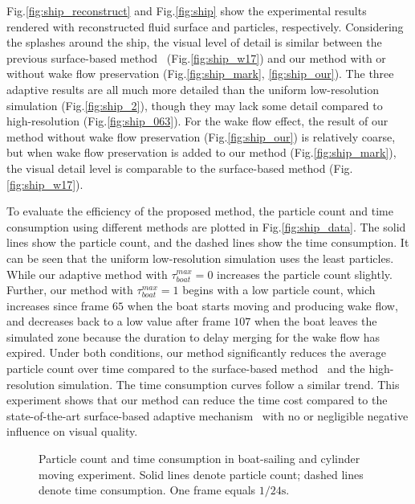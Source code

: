 \documentclass[VANCOUVER,STIX1COL]{WileyNJD-v2}
\begin{document}
Fig.\ref{fig:ship_reconstruct} and Fig.\ref{fig:ship} show the experimental results rendered with reconstructed fluid surface and particles, respectively. Considering the splashes around the ship, the visual level of detail is similar between the previous surface-based method~\cite{Winchenbach17} (Fig.\ref{fig:ship_w17}) and our method with or without wake flow preservation (Fig.\ref{fig:ship_mark}, \ref{fig:ship_our}). The three adaptive results are all much more detailed than the uniform low-resolution simulation (Fig.\ref{fig:ship_2}), though they may lack some detail compared to high-resolution (Fig.\ref{fig:ship_063}). For the wake flow effect, the result of our method without wake flow preservation (Fig.\ref{fig:ship_our}) is relatively coarse, but when wake flow preservation is added to our method (Fig.\ref{fig:ship_mark}), the visual detail level is comparable to the surface-based method (Fig.\ref{fig:ship_w17}).

To evaluate the efficiency of the proposed method, the particle count and time consumption using different methods are plotted in Fig.\ref{fig:ship_data}. The solid lines show the particle count, and the dashed lines show the time consumption. It can be seen that the uniform low-resolution simulation uses the least particles. While our adaptive method with $\tau_{boat}^{max} = 0$ increases the particle count slightly. Further, our method with $\tau_{boat}^{max} = 1$ begins with a low particle count, which increases since frame $65$ when the boat starts moving and producing wake flow, and decreases back to a low value after frame $107$ when the boat leaves the simulated zone because the duration to delay merging for the wake flow has expired. Under both conditions, our method significantly reduces the average particle count over time compared to the surface-based method~\cite{Winchenbach17} and the high-resolution simulation. The time consumption curves follow a similar trend. This experiment shows that our method can reduce the time cost compared to the state-of-the-art surface-based adaptive mechanism~\cite{Winchenbach17} with no or negligible negative influence on visual quality.

\begin{figure}
    \centering
    \vspace{-0.7\baselineskip}
    \caption{Particle count and time consumption in boat-sailing and cylinder moving experiment. Solid lines denote particle count; dashed lines denote time consumption. One frame equals $1/24\mathrm{s}$.}
    
\end{figure}
\end{document}
